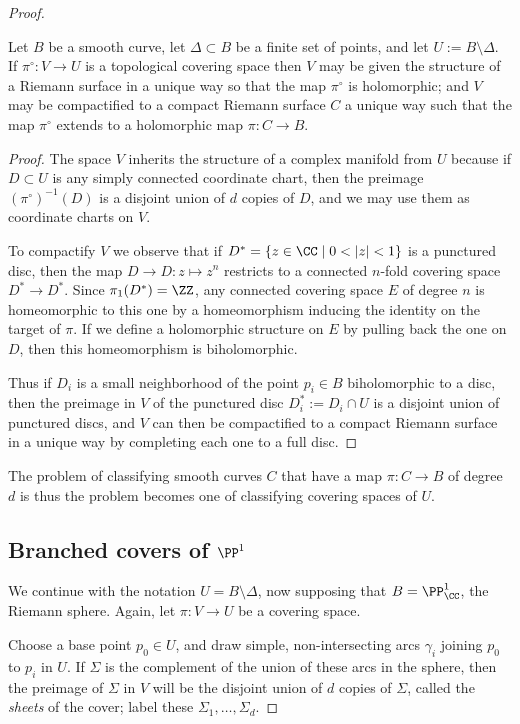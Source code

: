 \begin{proof}
\begin{theorem}
 Let $B$ be a smooth curve, let $\Delta\subset B$ be a finite set of points, and let $U := B\setminus \Delta$.
If $\pi^\circ : V \to U$ is a topological covering space then $V$ may be given the structure of a Riemann surface in a unique way so that the map $\pi^\circ$ is holomorphic; and $V$ may be compactified to a compact Riemann surface $C$ a unique way such that the map $\pi^\circ$ extends to a holomorphic map $\pi : C \to B$.
\end{theorem} 

\begin{proof}
The space $V$ inherits the structure of a complex manifold from $U$ because if $D \subset U$ is any simply connected coordinate chart, then the preimage $({\pi^\circ})^{-1}(D)$ is a disjoint union of $d$ copies of $D$, and we may use them as coordinate charts on $V$. 
   
To compactify $V$ we observe that if $D^* = \{ z \in \CC \mid 0 < |z| < 1 \}$ is a punctured disc, then
the map $D\to D: z \mapsto z^n$ restricts to a connected $n$-fold covering space $D^*\to D^*$. 
Since $\pi_1(D^*) = \ZZ$, any connected covering space $E$ of degree $n$ is homeomorphic to this one
by a homeomorphism inducing the identity on the target of $\pi$.
If we  define a holomorphic structure on $E$ by pulling back the one on $D$, then
this homeomorphism is biholomorphic.

Thus if $D_i$ is a small neighborhood of the point $p_i \in B$ biholomorphic to a disc, then the preimage  in $V$ of the punctured disc $D_i^* := D_i \cap U$ is a disjoint union of punctured discs, and $V$ can then be compactified to a compact Riemann surface in a unique way by completing each one to a full disc.
\end{proof}
   
 The problem of classifying smooth curves $C$ that have a map $\pi : C \to B$ of degree $d$ is thus the problem becomes one of classifying covering spaces of $U$. 
    
 \subsection{Branched covers of $\PP^1$} 

We continue with the notation $U = B\setminus \Delta$, now supposing that $B = \PP^1_\CC$, the Riemann sphere. Again, let $\pi:V\to U$ be a covering space.

Choose a base point $p_0 \in U$, and draw simple, non-intersecting arcs $\gamma_i$ joining $p_0$ to $p_i$ in $U$. If $\Sigma$ is the complement of the union of these arcs in the sphere, then the preimage of $\Sigma$ in $V$ will be the disjoint union of $d$ copies of $\Sigma$, called the \emph{sheets} of the cover; label these $\Sigma_1,\dots,\Sigma_d$.


\end{proof}
